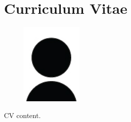 \cleardoublepage
\chapter*{Curriculum Vitae}


\begin{figure}
\vspace*{-12pt}
\includegraphics[width=30mm]{figs/cv/author}%
\end{figure}
\small

CV content.
